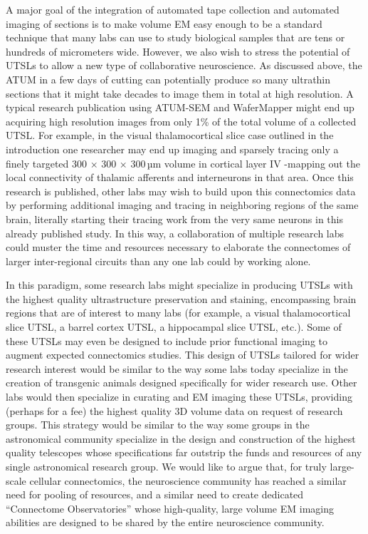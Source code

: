 \documentclass{article}
\begin{document}
A major goal of the integration of automated tape collection and automated imaging of sections is to make volume EM easy enough to be a standard technique that many labs can use to study biological samples that are tens or hundreds of micrometers wide. However, we also wish to stress the potential of UTSLs to allow a new type of collaborative neuroscience. As discussed above, the ATUM in a few days of cutting can potentially produce so many ultrathin sections that it might take decades to image them in total at high resolution. A typical research publication using ATUM-SEM and WaferMapper might end up acquiring high resolution images from only 1\% of the total volume of a collected UTSL. For example, in the visual thalamocortical slice case outlined in the introduction one researcher may end up imaging and sparsely tracing only a finely targeted 300 × 300 × 300\,µm volume in cortical layer IV -mapping out the local connectivity of thalamic afferents and interneurons in that area. Once this research is published, other labs may wish to build upon this connectomics data by performing additional imaging and tracing in neighboring regions of the same brain, literally starting their tracing work from the very same neurons in this already published study. In this way, a collaboration of multiple research labs could muster the time and resources necessary to elaborate the connectomes of larger inter-regional circuits than any one lab could by working alone.

In this paradigm, some research labs might specialize in producing UTSLs with the highest quality ultrastructure preservation and staining, encompassing brain regions that are of interest to many labs (for example, a visual thalamocortical slice UTSL, a barrel cortex UTSL, a hippocampal slice UTSL, etc.). Some of these UTSLs may even be designed to include prior functional imaging to augment expected connectomics studies. This design of UTSLs tailored for wider research interest would be similar to the way some labs today specialize in the creation of transgenic animals designed specifically for wider research use. Other labs would then specialize in curating and EM imaging these UTSLs, providing (perhaps for a fee) the highest quality 3D volume data on request of research groups. This strategy would be similar to the way some groups in the astronomical community specialize in the design and construction of the highest quality telescopes whose specifications far outstrip the funds and resources of any single astronomical research group. We would like to argue that, for truly large-scale cellular connectomics, the neuroscience community has reached a similar need for pooling of resources, and a similar need to create dedicated “Connectome Observatories” whose high-quality, large volume EM imaging abilities are designed to be shared by the entire neuroscience community.
\end{document}
